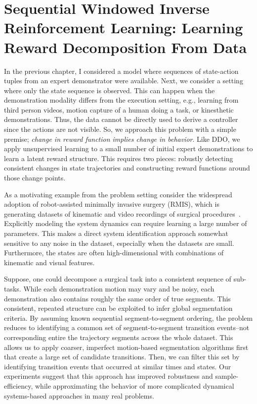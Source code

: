 \chapter{Sequential Windowed Inverse Reinforcement Learning: Learning Reward Decomposition From Data}
In the previous chapter, I considered a model where sequences of state-action tuples from an expert demonstrator were available.
Next, we consider a setting where only the state sequence is observed.
This can happen when the demonstration modality differs from the execution setting, e.g., learning from third person videos, motion capture of a human doing a task, or kinesthetic demonstrations. 
Thus, the data cannot be directly used to derive a controller since the actions are not visible.
So, we approach this problem with a simple premise;  \emph{change in reward function implies change in behavior}.
Like DDO, we apply unsupervised learning to a small number of initial expert demonstrations to learn a latent reward structure. This requires two pieces: robustly detecting consistent changes in state trajectories and constructing reward functions around those change points.

As a motivating example from the problem setting consider the widespread adoption of robot-assisted minimally invasive surgery (RMIS), which is generating datasets of kinematic and video recordings of surgical procedures~\cite{gao2014jigsaws}.
Explicitly modeling the system dynamics can require learning a large number of parameters.
This makes a direct system identification approach somewhat sensitive to any noise in the dataset, especially when the datasets are small. 
Furthermore, the states are often high-dimensional with combinations of kinematic and visual features.

Suppose, one could decompose a surgical task into a consistent sequence of sub-tasks.
While each demonstration motion may vary and be noisy, each demonstration also contains roughly the same order of true segments.
This consistent, repeated structure can be exploited to infer global segmentation criteria.
By assuming known sequential segment-to-segment ordering, the problem reduces to identifying a common set of segment-to-segment transition events--not corresponding entire the trajectory segments across the whole dataset.
This allows us to apply coarser, imperfect motion-based segmentation algorithms first that create a large set of candidate transitions.
Then, we can filter this set by identifying transition events that occurred at similar times and states.
Our experiments suggest that this approach has improved robustness and sample-efficiency, while approximating the behavior of more complicated dynamical systems-based approaches in many real problems.

